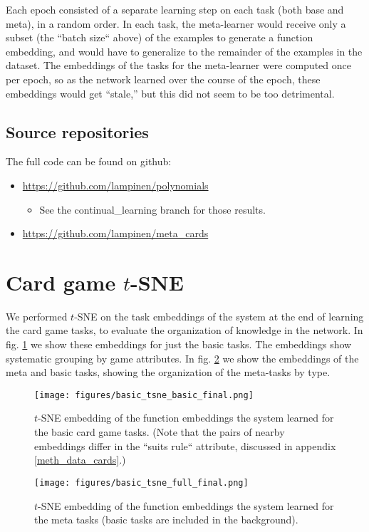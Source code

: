 \documentclass{article}
\begin{document}
Each epoch consisted of a separate learning step on each task (both base and meta), in a random order. In each task, the meta-learner would receive only a subset (the ``batch size`` above) of the examples to generate a function embedding, and would have to generalize to the remainder of the examples in the dataset. The embeddings of the tasks for the meta-learner were computed once per epoch, so as the network learned over the course of the epoch, these embeddings would get ``stale,'' but this did not seem to be too detrimental. \par 

\subsection{Source repositories}
The full code can be found on github:
\begin{itemize}
\item \url{https://github.com/lampinen/polynomials}
    \begin{itemize}
        \item See the continual\_learning branch for those results. 
    \end{itemize}
\item \url{https://github.com/lampinen/meta_cards} 
\end{itemize}
\section{Card game $t$-SNE} \label{app_cards_tsne}
We performed $t$-SNE \citep{LaurensvanderMaaten2008} on the task embeddings of the system at the end of learning the card game tasks, to evaluate the organization of knowledge in the network. In fig. \ref{fig_cards_tsne_basic} we show these embeddings for just the basic tasks. The embeddings show systematic grouping by game attributes. In fig. \ref{fig_cards_tsne_full} we show the embeddings of the meta and basic tasks, showing the organization of the meta-tasks by type. \par 
\begin{figure}[H]
\centering
\texttt{[image: figures/basic\_tsne\_basic\_final.png]}
\caption{$t$-SNE embedding of the function embeddings the system learned for the basic card game tasks. (Note that the pairs of nearby embeddings differ in the ``suits rule`` attribute, discussed in appendix \ref{meth_data_cards}.)} 
\label{fig_cards_tsne_basic}
\end{figure}%
\begin{figure}[H]
\centering
\texttt{[image: figures/basic\_tsne\_full\_final.png]}
\caption{$t$-SNE embedding of the function embeddings the system learned for the meta tasks (basic tasks are included in the background).} 
\label{fig_cards_tsne_full}
\end{figure}
\end{document}
